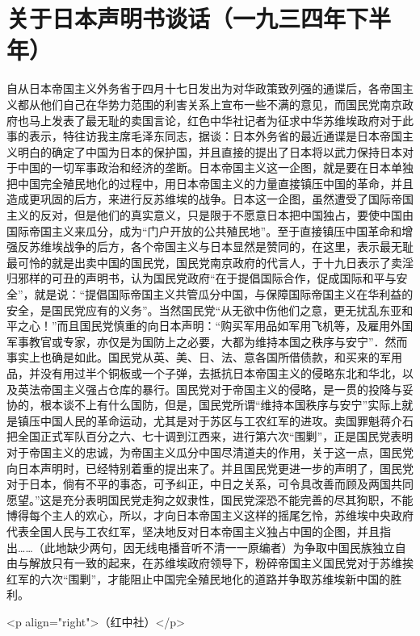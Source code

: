 \section[关于日本声明书谈话（一九三四年下半年）]{关于日本声明书谈话（一九三四年下半年）}


自从日本帝国主义外务省于四月十七日发出为对华政策致列强的通谍后，各帝国主义都从他们自己在华势力范围的利害关系上宣布一些不满的意见，而国民党南京政府也马上发表了最无耻的卖国言论，红色中华社记者为征求中华苏维埃政府对于此事的表示，特往访我主席毛泽东同志，据谈：日本外务省的最近通谍是日本帝国主义明白的确定了中国为日本的保护国，并且直接的提出了日本将以武力保持日本对于中国的一切军事政治和经济的垄断。日本帝国主义这一企图，就是要在日本单独把中国完全殖民地化的过程中，用日本帝国主义的力量直接镇压中国的革命，并且造成更巩固的后方，来进行反苏维埃的战争。日本这一企图，虽然遭受了国际帝国主义的反对，但是他们的真实意义，只是限于不愿意日本把中国独占，要使中国由国际帝国主义来瓜分，成为“门户开放的公共殖民地”。至于直接镇压中国革命和增强反苏维埃战争的后方，各个帝国主义与日本显然是赞同的，在这里，表示最无耻最可怜的就是出卖中国的国民党，国民党南京政府的代言人，于十九日表示了卖淫归邪样的可丑的声明书，认为国民党政府“在于提倡国际合作，促成国际和平与安全”，就是说：“提倡国际帝国主义共管瓜分中国，与保障国际帝国主义在华利益的安全，是国民党应有的义务”。当然国民党“从无欲中伤他们之意，更无扰乱东亚和平之心！”而且国民党慎重的向日本声明：“购买军用品如军用飞机等，及雇用外国军事教官或专家，亦仅是为国防上之必要，大都为维持本国之秩序与安宁”．然而事实上也确是如此。国民党从英、美、日、法、意各国所借债款，和买来的军用品，并没有用过半个铜板或一个子弹，去抵抗日本帝国主义的侵略东北和华北，以及英法帝国主义强占仓库的暴行。国民党对于帝国主义的侵略，是一贯的投降与妥协的，根本谈不上有什么国防，但是，国民党所谓“维持本国秩序与安宁”实际上就是镇压中国人民的革命运动，尤其是对于苏区与工农红军的进攻。卖国罪魁蒋介石把全国正式军队百分之六、七十调到江西来，进行第六次“围剿”，正是国民党表明对于帝国主义的忠诚，为帝国主义瓜分中国尽清道夫的作用，关于这一点，国民党向日本声明时，已经特别着重的提出来了。并且国民党更进一步的声明了，国民党对于日本，倘有不平的事态，可予纠正，中日之关系，可令具改善而顾及两国共同愿望。”这是充分表明国民党走狗之奴隶性，国民党深恐不能完善的尽其狗职，不能博得每个主人的欢心，所以，才向日本帝国主义这样的摇尾乞怜，苏维埃中央政府代表全国人民与工农红军，坚决地反对日本帝国主义独占中国的企图，并且指出……（此地缺少两句，因无线电播音听不清一一原编者）为争取中国民族独立自由与解放只有一致的起来，在苏维埃政府领导下，粉碎帝国主义国民党对于苏维挨红军的六次“围剿”，才能阻止中国完全殖民地化的道路并争取苏维埃新中国的胜利。


<p align="right">（红中社）</p>


